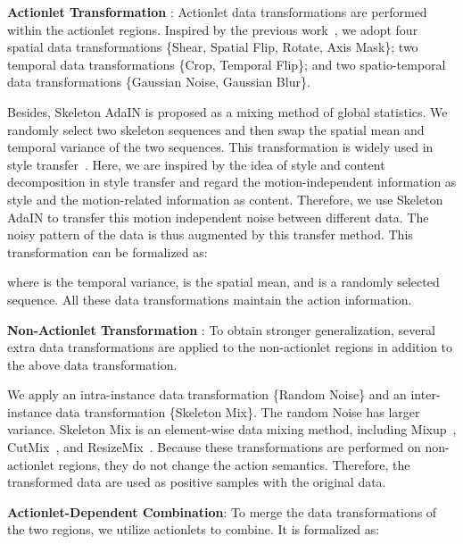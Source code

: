 \documentclass[twocolumn]{article}
\newcommand{\wh}[1]{\textcolor{black}{#1}}
\begin{document}
\vspace{1mm}

 \textbf{Actionlet Transformation }: 
Actionlet data transformations are performed within the actionlet regions. Inspired by the previous work~\cite{guo2021contrastive}, we adopt four spatial data transformations \{Shear, Spatial Flip, Rotate, Axis Mask\}; two temporal data transformations \{Crop, Temporal Flip\}; and two spatio-temporal data transformations \{Gaussian Noise, Gaussian Blur\}.

Besides, Skeleton AdaIN is proposed as a mixing method of global statistics. 
We randomly select two skeleton sequences and then swap the spatial mean and temporal variance of the two sequences. 
This transformation is widely used in style transfer~\cite{huang2017arbitrary}.
Here, we are inspired by the idea of style and content decomposition in style transfer and regard the motion-independent information as style and the motion-related information as content. Therefore, we use Skeleton AdaIN to transfer this motion independent noise between different data.
The noisy pattern of the data is thus augmented by this transfer method.
This transformation can be formalized as:

where  is the temporal variance\wh{,}  is the spatial mean, and  is a randomly selected sequence. All these data transformations maintain the action information.

\vspace{1mm}

 \textbf{Non-Actionlet Transformation }: 
To obtain stronger generalization, several extra data transformations are applied to the non-actionlet regions in addition to the above data transformation.

We apply an intra-instance data transformation \{Random Noise\} and an inter-instance data transformation \{Skeleton Mix\}. The random Noise has larger variance. Skeleton Mix is an element-wise data mixing method, including Mixup~\cite{zhang2017mixup}, CutMix~\cite{yun2019cutmix}, and ResizeMix~\cite{ren2022simple}. Because these transformations are performed on non-actionlet regions, they do not change the action semantics. Therefore, the transformed data are used as positive samples with the original data.











 \textbf{Actionlet-Dependent Combination}:
To merge the data transformations of the two regions, we utilize actionlets to combine.
It is formalized as:
\end{document}
